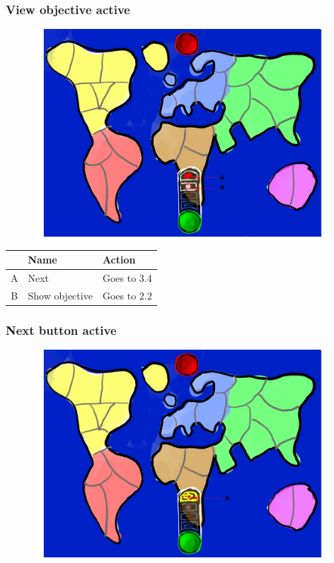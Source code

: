 \documentclass[12pt,a4paper]{article}
\begin{document}
\newpage
\subsubsection{View objective active}

\begin{figure}[H]
  \centering
  \includegraphics[width=11cm]{pic/mocks/3-3.pdf}
\end{figure}

\begin{table}[H]
\small
\centering
\begin{tabular}{c|p{5cm}|p{7cm}}
& Name & Action \\ \hline\hline
A
&Next
&Goes to 3.4
\\B
&Show objective
&Goes to 2.2
\end{tabular}
\end{table}

\subsubsection{Next button active}

\begin{figure}[H]
  \centering
  \includegraphics[width=11cm]{pic/mocks/3-4.pdf}
\end{figure}
\end{document}
